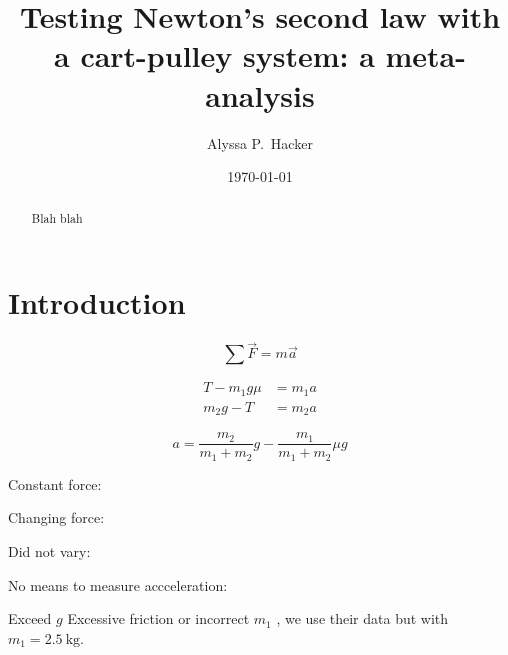 \documentclass[reprint,amsmath,amssymb,aps,twoside]{revtex4-2}
\begin{document}
\setcounter{page}{1}
\title{Testing Newton's second law with a cart-pulley system: a meta-analysis}

\author{Alyssa P.~Hacker}
\date{\today}

\begin{abstract}
Blah blah
\end{abstract}


\maketitle\thispagestyle{mytitlepage}





\section{Introduction}
\begin{equation}
\sum\vec{F} = m\vec{a}
\label{eq:n2l}
\end{equation}

\begin{align}
T - m_1 g \mu &= m_1 a \\
m_2 g - T &= m_2 a 
\end{align}

\begin{equation}
a = \dfrac{m_2}{m_1+m_2} g - \dfrac{m_1}{m_1+m_2} \mu g
\end{equation}

Constant force: \cite{arenas-2024-testing,avalur-2024-verifying,canada-2024-experimental,kishore-2024-relationship,yagnyeshwaran-2024-verifying}

Changing force: \cite{govardhanen-2024-newtons,kedharnath-2024-examining,krasnopolsky-2024-testing}

Did not vary: \cite{perle-2024-experimental}

No means to measure accceleration: \cite{barone-2024-investigating}

Exceed $g$ \cite{krasnopolsky-2024-testing}
Excessive friction or incorrect $m_1$ \cite{govardhanen-2024-newtons}, we use their data but with $m_1=\qty{2.5}{\kilo\gram}$.
\end{document}
